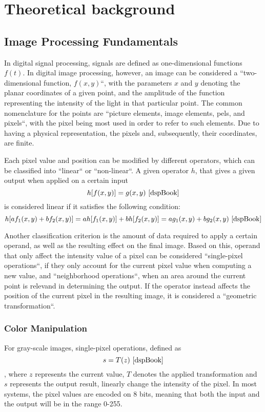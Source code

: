 \chapter{Theoretical background}

\section{Image Processing Fundamentals}

In digital signal processing, signals are defined as one-dimensional functions \(f(t)\). In digital image
processing, however, an image can be considered a ``two-dimensional function, \(f(x, y)\)``, with  the
parameters \(x\) and \(y\) denoting the planar coordinates of a given point, and the amplitude of the function
representing the intensity of the light in that particular point. The common nomenclature for the points
are ``picture elements, image elements, pels, and pixels``, with the pixel being most used in order
to refer to such elements. Due to having a physical representation, the pixels and, subsequently,
their coordinates, are finite. \cite{dspBook}

Each pixel value and position can be modified by different operators, which can be classified into ``linear``
or ``non-linear``. A given operator \(h\), that gives a given output when applied on a certain input
\[h[f(x, y)] = g(x, y) \text{ \cite{dspBook}}\] is considered linear if it satisfies the following condition:
\[h[a f_1(x, y) + b f_2(x, y)] = a h[f_1(x, y)] + b h[f_2(x, y)] =
	a g_1(x, y) + b g_2(x, y) \text{ \cite{dspBook}}\]

Another classification criterion is the amount of data required to apply a certain operand, as well as the
resulting effect on the final image. Based on this, operand that only affect the intensity value of a pixel
can be considered ``single-pixel operations``, if they only account for the current pixel value when computing
a new value, and ``neighborhood operations``, when an area around the current point is relevand in determining
the output. If the operator instead affects the position of the current pixel in the resulting image, it is
considered a ``geometric transformation``. \cite{dspBook}

\subsection{Color Manipulation}

For gray-scale images, single-pixel operations, defined as \[s = T(z) \text{ \cite{dspBook}}\], where \(z\)
represents the current value, \(T\) denotes the applied transformation and \(s\) represents the output
result, linearly change the intensity of the pixel. In most systems, the pixel values are encoded on 8 bits,
meaning that both the input and the output will be in the range 0-255.

